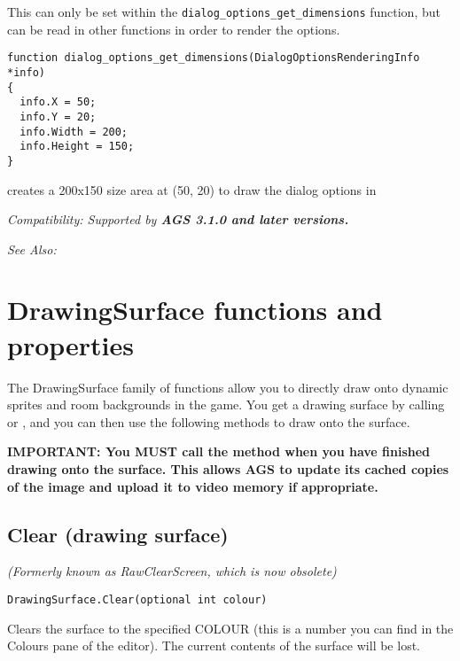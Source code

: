 This can only be set within the \verb$dialog_options_get_dimensions$ function, but
can be read in other functions in order to render the options.

\begin{verbatim}
function dialog_options_get_dimensions(DialogOptionsRenderingInfo *info)
{
  info.X = 50;
  info.Y = 20;
  info.Width = 200;
  info.Height = 150;
}
\end{verbatim}
creates a 200x150 size area at (50, 20) to draw the dialog options in

\it{Compatibility:} Supported by \bf{AGS 3.1.0} and later versions.

\it{See Also:} 



\section{DrawingSurface functions and properties}\label{DrawingSurfaceFunctions}%

The DrawingSurface family of functions allow you to directly draw onto dynamic sprites
and room backgrounds in the game. You get a drawing surface by calling
 or
,
and you can then use the following methods to draw onto the surface.

\bf{IMPORTANT:} You \bf{MUST} call the  method
when you have finished drawing onto the surface. This allows AGS to update its cached
copies of the image and upload it to video memory if appropriate.


\subsection{Clear (drawing surface)}\label{DrawingSurface.Clear}%

\it{(Formerly known as RawClearScreen, which is now obsolete)}

\begin{verbatim}
DrawingSurface.Clear(optional int colour)
\end{verbatim}
Clears the surface to the specified COLOUR (this is a number you can find in
the Colours pane of the editor). The current contents of the surface will be lost.

